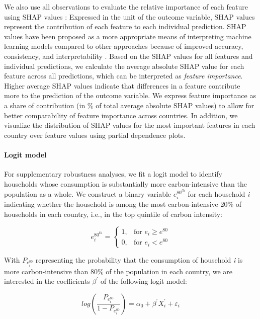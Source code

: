 \documentclass[12pt, a4paper]{article}
\begin{document}
We also use all observations to evaluate the relative importance of each feature using SHAP values \autocite{Lundberg.2017}: Expressed in the unit of the outcome variable, SHAP values represent the contribution of each feature to each individual prediction. SHAP values have been proposed as a more appropriate means of interpreting machine learning models compared to other approaches because of improved accuracy, consistency, and interpretability \autocite{Lundberg.2020}. Based on the SHAP values for all features and individual predictions, we calculate the average absolute SHAP value for each feature across all predictions, which can be interpreted as \textit{feature importance}. Higher average SHAP values indicate that differences in a feature contribute more to the prediction of the outcome variable. We express feature importance as a share of contribution (in \% of total average absolute SHAP values) to allow for better comparability of feature importance across countries. In addition, we visualize the distribution of SHAP values for the most important features in each country over feature values using partial dependence plots. 

\paragraph{Logit model} For supplementary robustness analyses, we fit a logit model to identify households whose consumption is substantially more carbon-intensive than the population as a whole. We construct a binary variable $e_{i}^{80^{th}}$ for each household \textit{i} indicating whether the household is among the most carbon-intensive 20\% of households in each country, i.e., in the top quintile of carbon intensity:

\begin{equation}\label{eq:logit}
    e_{i}^{80^{th}} =
    \begin{cases}
    1, & \text{for }  e_{i} \geq e^{80} \\
    0, & \text{for }  e_{i} < e^{80}
    \end{cases}
\end{equation}

With $P_{e_{i}^{80}}$ representing the probability that the consumption of household \textit{i} is more carbon-intensive than 80\% of the population in each country, we are interested in the coefficients $\beta^{'}$ of the following logit model:

\begin{equation} \label{logit}
    log \left( \frac{P_{e_{i}^{80}}}{1 - P_{e_{i}^{80}}} \right) = \alpha_{0} + \beta^{'} X_{i}^{'} + \varepsilon_{i}
\end{equation}
\end{document}
